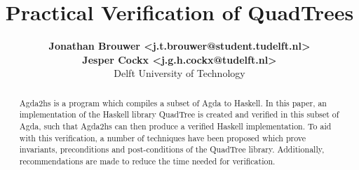 \documentclass[english]{article}
\begin{document}
\title{\textbf{Practical Verification of QuadTrees}}
\author{
	\textbf{Jonathan Brouwer <j.t.brouwer@student.tudelft.nl>} \\ 
	\textbf{Jesper Cockx <j.g.h.cockx@tudelft.nl>} \\ 
	Delft University of Technology
}
\maketitle

\begin{abstract}
Agda2hs is a program which compiles a subset of Agda to Haskell. In this paper, an implementation of the Haskell library QuadTree is created and verified in this subset of Agda, such that Agda2hs can then produce a verified Haskell implementation. To aid with this verification, a number of techniques have been proposed which prove invariants, preconditions and post-conditions of the QuadTree library. Additionally, recommendations are made to reduce the time needed for verification.
\end{abstract}









\end{document}
